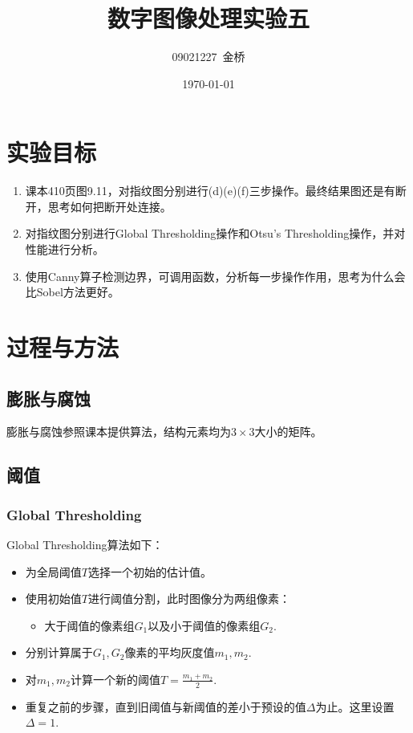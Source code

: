 \documentclass{article}
\title{数字图像处理实验五}
\author{09021227~金桥}
\date{\today}
\begin{document}
\maketitle

\section{实验目标}

\begin{enumerate}
    \item 课本410页图9.11，对指纹图分别进行(d)(e)(f)三步操作。最终结果图还是有断开，思考如何把断开处连接。
    \item 对指纹图分别进行Global Thresholding操作和Otsu's Thresholding操作，并对性能进行分析。
    \item 使用Canny算子检测边界，可调用函数，分析每一步操作作用，思考为什么会比Sobel方法更好。
\end{enumerate}

\section{过程与方法}

\subsection{膨胀与腐蚀}

膨胀与腐蚀参照课本提供算法，结构元素均为$3\times 3$大小的矩阵。

\subsection{阈值}

\subsubsection{Global Thresholding}

Global Thresholding算法如下：
\begin{itemize}
    \item 为全局阈值$T$选择一个初始的估计值。
    \item 使用初始值$T$进行阈值分割，此时图像分为两组像素：
    \begin{itemize}
        \item 大于阈值的像素组$G_1$以及小于阈值的像素组$G_2$.
    \end{itemize}
    \item 分别计算属于$G_1, G_2$像素的平均灰度值$m_1, m_2$.
    \item 对$m_1, m_2$计算一个新的阈值$T=\frac{m_1+m_2}{2}$.
    \item 重复之前的步骤，直到旧阈值与新阈值的差小于预设的值$\Delta$为止。这里设置$\Delta = 1$.
\end{itemize}
\end{document}
